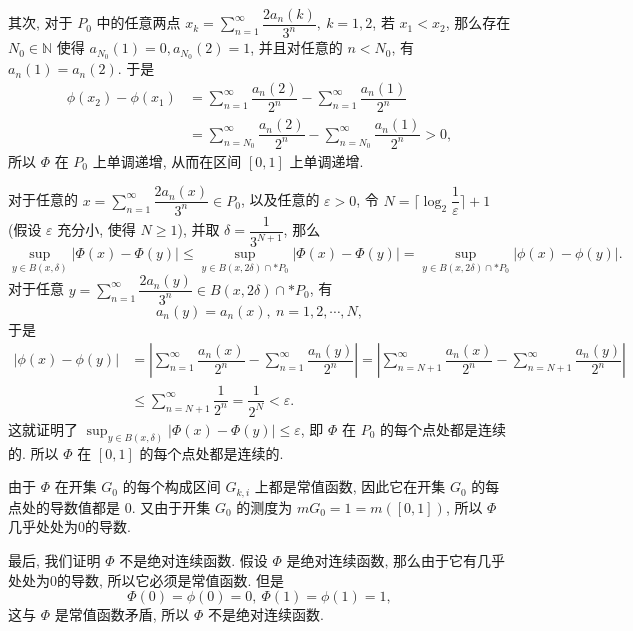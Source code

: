 \begin{solution}
\begin{enumerate}
其次, 对于 \(P_0\) 中的任意两点 \(x_k = \displaystyle \sum\limits_{n=1}^{\infty} \dfrac{2a_n(k)}{3^n}, ~ k = 1, 2\), 若 \(x_1 < x_2\), 那么存在 \(N_0 \in \mathbb{N}\) 使得 \(a_{N_0}(1) = 0, a_{N_0}(2) = 1\), 并且对任意的 \(n < N_0\), 有 \(a_n(1) = a_n(2)\). 于是
\[\begin{aligned}
\phi(x_2) - \phi(x_1) & = \sum\limits_{n=1}^{\infty} \dfrac{a_n(2)}{2^n} - \sum\limits_{n=1}^{\infty} \dfrac{a_n(1)}{2^n} \\
& = \sum\limits_{n=N_0}^{\infty} \dfrac{a_n(2)}{2^n} - \sum\limits_{n=N_0}^{\infty} \dfrac{a_n(1)}{2^n} > 0,
\end{aligned}\]
所以 \(\Phi\) 在 \(P_0\) 上单调递增, 从而在区间 \([0, 1]\) 上单调递增.

对于任意的 \(\displaystyle x = \sum\limits_{n=1}^{\infty} \dfrac{2a_n(x)}{3^n} \in P_0\), 以及任意的 \(\varepsilon > 0\), 令 \(N = \lceil \log_2 \dfrac{1}{\varepsilon} \rceil + 1\) (假设 \(\varepsilon\) 充分小, 使得 \(N \geqslant 1\)), 并取 \(\delta = \dfrac{1}{3^{N+1}}\), 那么
\[\sup_{y \in B(x, \delta)} \lvert \Phi(x) - \Phi(y) \rvert \leqslant \sup_{y \in B(x, 2\delta) \cap* P_0} \lvert \Phi(x) - \Phi(y) \rvert = \sup_{y \in B(x, 2\delta) \cap* P_0} \lvert \phi(x) - \phi(y) \rvert.\]
对于任意 \(\displaystyle y = \sum\limits_{n=1}^{\infty} \dfrac{2a_n(y)}{3^n} \in B(x, 2\delta) \cap* P_0\), 有
\[a_n(y) = a_n(x), ~ n = 1, 2, \cdots, N,\]
于是
\[\begin{aligned}
\lvert \phi(x) - \phi(y) \rvert & = \left\lvert \sum\limits_{n=1}^{\infty} \dfrac{a_n(x)}{2^n} - \sum\limits_{n=1}^{\infty} \dfrac{a_n(y)}{2^n} \right\rvert = \left\lvert \sum\limits_{n=N+1}^{\infty} \dfrac{a_n(x)}{2^n} - \sum\limits_{n=N+1}^{\infty} \dfrac{a_n(y)}{2^n} \right\rvert \\
& \leqslant \sum\limits_{n=N+1}^{\infty} \dfrac{1}{2^n} = \dfrac{1}{2^{N}} < \varepsilon.
\end{aligned}\]
这就证明了 \(\displaystyle \sup_{y \in B(x, \delta)} \lvert \Phi(x) - \Phi(y) \rvert \leqslant \varepsilon\), 即 \(\Phi\) 在 \(P_0\) 的每个点处都是连续的. 所以 \(\Phi\) 在 \([0, 1]\) 的每个点处都是连续的.

由于 \(\Phi\) 在开集 \(G_0\) 的每个构成区间 \(G_{k, i}\) 上都是常值函数, 因此它在开集 \(G_0\) 的每点处的导数值都是 \(0\). 又由于开集 \(G_0\) 的测度为 \(m G_0 = 1 = m ([0, 1])\), 所以 \(\Phi\) 几乎处处为0的导数.

最后, 我们证明 \(\Phi\) 不是绝对连续函数. 假设 \(\Phi\) 是绝对连续函数, 那么由于它有几乎处处为0的导数, 所以它必须是常值函数. 但是
\[\Phi(0) = \phi(0) = 0, ~ \Phi(1) = \phi(1) = 1,\]
这与 \(\Phi\) 是常值函数矛盾, 所以 \(\Phi\) 不是绝对连续函数.


\end{enumerate}
\end{solution}
